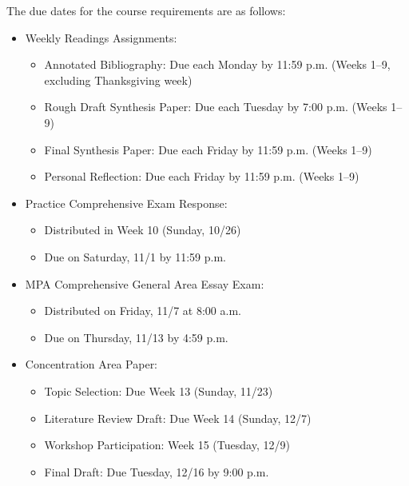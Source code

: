 \documentclass[12pt]{article}     %
\begin{document}
The due dates for the course requirements are as follows:
    \begin{itemize}
        \item Weekly Readings Assignments:
        \begin{itemize}
            \item Annotated Bibliography: Due each Monday by 11:59 p.m. (Weeks 1--9, excluding Thanksgiving week)
            \item Rough Draft Synthesis Paper: Due each Tuesday by 7:00 p.m. (Weeks 1--9)
            \item Final Synthesis Paper: Due each Friday by 11:59 p.m. (Weeks 1--9)
            \item Personal Reflection: Due each Friday by 11:59 p.m. (Weeks 1--9)
        \end{itemize}
        \item Practice Comprehensive Exam Response:
        \begin{itemize}
            \item Distributed in Week 10 (Sunday, 10/26)
            \item Due on Saturday, 11/1 by 11:59 p.m.
        \end{itemize}
        \item MPA Comprehensive General Area Essay Exam:
        \begin{itemize}
            \item Distributed on Friday, 11/7 at 8:00 a.m.
            \item Due on Thursday, 11/13 by 4:59 p.m.
        \end{itemize}
        \item Concentration Area Paper:
        \begin{itemize}
            \item Topic Selection: Due Week 13 (Sunday, 11/23)
            \item Literature Review Draft: Due Week 14 (Sunday, 12/7)
            \item Workshop Participation: Week 15 (Tuesday, 12/9)
            \item Final Draft: Due Tuesday, 12/16 by 9:00 p.m.
        \end{itemize}
    \end{itemize}
\end{document}
